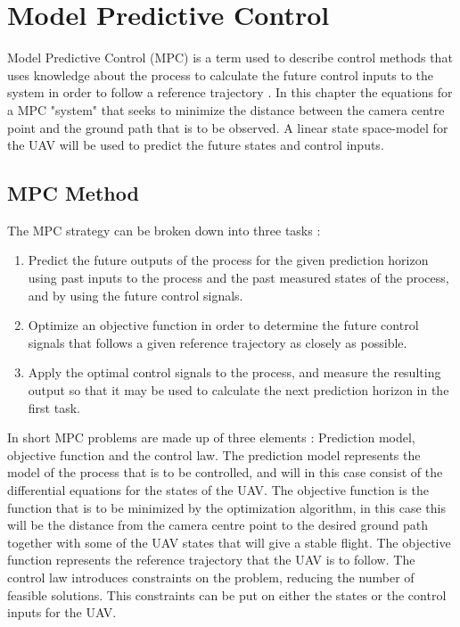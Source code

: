 \chapter{Model Predictive Control}
\label{ch:optimization}

Model Predictive Control (MPC) is a term used to describe control methods that uses knowledge about the process to calculate the future control inputs to the system in order to follow a reference trajectory \cite{mpcCAMACHO}. In this chapter the equations for a MPC "system" that seeks to minimize the distance between the camera centre point and the ground path that is to be observed. A linear state space-model for the UAV will be used to predict the future states and control inputs.


\section{MPC Method}

The MPC strategy can be broken down into three tasks \cite{mpcCAMACHO}:

\begin{enumerate}
	\item Predict the future outputs of the process for the given prediction horizon using past inputs to the process and the past measured states of the process, and by using the future control signals.
	\item Optimize an objective function in order to determine the future control signals that follows a given reference trajectory as closely as possible.
	\item Apply the optimal control signals to the process, and measure the resulting output so that it may be used to calculate the next prediction horizon in the first task.
\end{enumerate}

In short MPC problems are made up of three elements \cite{mpcCAMACHO}: Prediction model, objective function and the control law. The prediction model represents the model of the process that is to be controlled, and will in this case consist of the differential equations for the states of the UAV. The objective function is the function that is to be minimized by the optimization algorithm, in this case this will be the distance from the camera centre point to the desired ground path together with some of the UAV states that will give a stable flight. The objective function represents the reference trajectory that the UAV is to follow. The control law introduces constraints on the problem, reducing the number of feasible solutions. This constraints can be put on either the states or the control inputs for the UAV.

